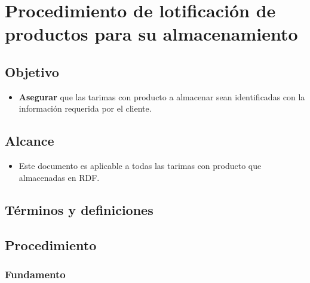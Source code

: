 \thispagestyle{formato-PI}
\renewcommand{\MayorVer}{2}
\renewcommand{\MenorVer}{1}
\renewcommand{\Codigo}{PSA-2-PRO} 
\renewcommand{\FechaPub}{2023--01}
\renewcommand{\Titulo}{Procedimiento de lotificación de productos para su almacenamiento}

\section{\Titulo}


\subsection{Objetivo}

\begin{itemize}
	\item \textbf{Asegurar} que las tarimas con producto a almacenar sean identificadas con la información requerida por el cliente.
\end{itemize}

\subsection{Alcance}

\begin{itemize}
	\item Este documento es aplicable a todas las tarimas con producto que almacenadas en RDF.
\end{itemize}

\subsection{Términos y definiciones}

\subsection{Procedimiento}

\subsubsection{Fundamento}

